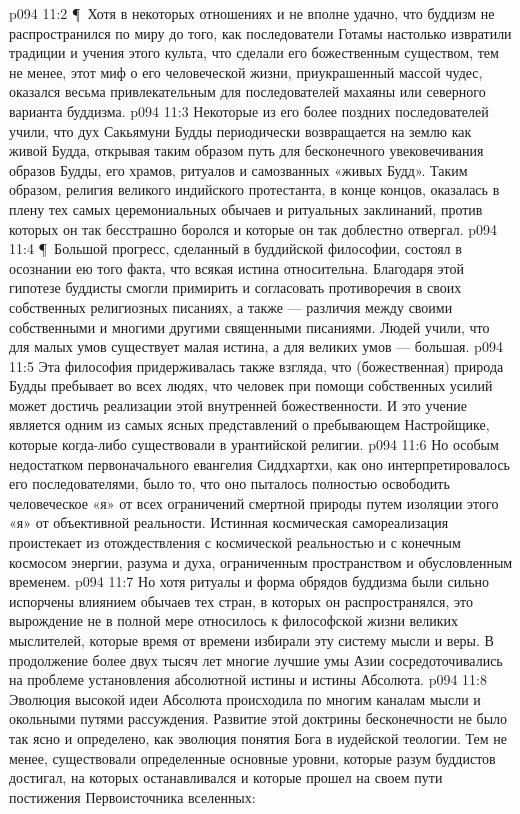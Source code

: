 \vs p094 11:2 \P\ Хотя в некоторых отношениях и не вполне удачно, что буддизм не распространился по миру до того, как последователи Готамы настолько извратили традиции и учения этого культа, что сделали его божественным существом, тем не менее, этот миф о его человеческой жизни, приукрашенный массой чудес, оказался весьма привлекательным для последователей махаяны или северного варианта буддизма.
\vs p094 11:3 Некоторые из его более поздних последователей учили, что дух Сакьямуни Будды периодически возвращается на землю как живой Будда, открывая таким образом путь для бесконечного увековечивания образов Будды, его храмов, ритуалов и самозванных «живых Будд». Таким образом, религия великого индийского протестанта, в конце концов, оказалась в плену тех самых церемониальных обычаев и ритуальных заклинаний, против которых он так бесстрашно боролся и которые он так доблестно отвергал.
\vs p094 11:4 \P\ Большой прогресс, сделанный в буддийской философии, состоял в осознании ею того факта, что всякая истина относительна. Благодаря этой гипотезе буддисты смогли примирить и согласовать противоречия в своих собственных религиозных писаниях, а также --- различия между своими собственными и многими другими священными писаниями. Людей учили, что для малых умов существует малая истина, а для великих умов --- большая.
\vs p094 11:5 Эта философия придерживалась также взгляда, что (божественная) природа Будды пребывает во всех людях, что человек при помощи собственных усилий может достичь реализации этой внутренней божественности. И это учение является одним из самых ясных представлений о пребывающем Настройщике, которые когда\hyp{}либо существовали в урантийской религии.
\vs p094 11:6 Но особым недостатком первоначального евангелия Сиддхартхи, как оно интерпретировалось его последователями, было то, что оно пыталось полностью освободить человеческое «я» от всех ограничений смертной природы путем изоляции этого «я» от объективной реальности. Истинная космическая самореализация проистекает из отождествления с космической реальностью и с конечным космосом энергии, разума и духа, ограниченным пространством и обусловленным временем.
\vs p094 11:7 Но хотя ритуалы и форма обрядов буддизма были сильно испорчены влиянием обычаев тех стран, в которых он распространялся, это вырождение не в полной мере относилось к философской жизни великих мыслителей, которые время от времени избирали эту систему мысли и веры. В продолжение более двух тысяч лет многие лучшие умы Азии сосредоточивались на проблеме установления абсолютной истины и истины Абсолюта.
\vs p094 11:8 Эволюция высокой идеи Абсолюта происходила по многим каналам мысли и окольными путями рассуждения. Развитие этой доктрины бесконечности не было так ясно и определено, как эволюция понятия Бога в иудейской теологии. Тем не менее, существовали определенные основные уровни, которые разум буддистов достигал, на которых останавливался и которые прошел на своем пути постижения Первоисточника вселенных:
